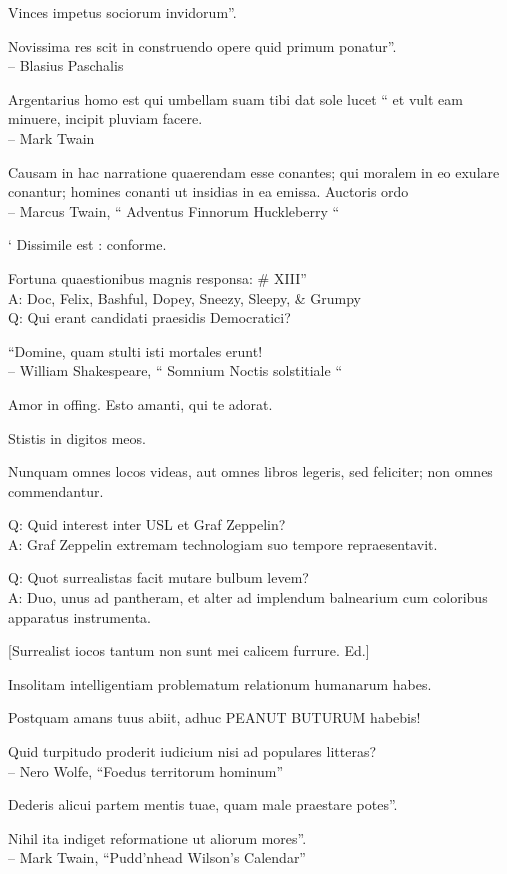 \documentclass[titlepage,12pt]{memoir}
\begin{document}
Vinces impetus sociorum invidorum”.

Novissima res scit in construendo opere quid primum ponatur”.
\\-- Blasius Paschalis

 Argentarius homo est qui umbellam suam tibi dat sole lucet “
et vult eam minuere, incipit pluviam facere.
\\-- Mark Twain

 Causam in hac narratione quaerendam esse conantes;
qui moralem in eo exulare conantur; homines conanti
ut insidias in ea emissa. Auctoris ordo
\\-- Marcus Twain, “ Adventus Finnorum Huckleberry “

‘ Dissimile est : conforme.

Fortuna quaestionibus magnis responsa: \# XIII”\\
A: Doc, Felix, Bashful, Dopey, Sneezy, Sleepy, \& Grumpy
\\Q: Qui erant candidati praesidis Democratici?

“Domine, quam stulti isti mortales erunt!
\\-- William Shakespeare, “ Somnium Noctis solstitiale “

Amor in offing. Esto amanti, qui te adorat.

Stistis in digitos meos.

Nunquam omnes locos videas, aut omnes libros legeris, sed feliciter;
non omnes commendantur.

Q: Quid interest inter USL et Graf Zeppelin?\\
A: Graf Zeppelin extremam technologiam suo tempore repraesentavit.

Q: Quot surrealistas facit mutare bulbum levem?\\
A: Duo, unus ad pantheram, et alter ad implendum balnearium
cum coloribus apparatus instrumenta.

[Surrealist iocos tantum non sunt mei calicem furrure. Ed.]

 Insolitam intelligentiam problematum relationum humanarum habes.

Postquam amans tuus abiit, adhuc PEANUT BUTURUM habebis!

Quid turpitudo proderit iudicium nisi ad populares litteras?
\\-- Nero Wolfe, “Foedus territorum hominum”

Dederis alicui partem mentis tuae, quam male praestare potes”.

Nihil ita indiget reformatione ut aliorum mores”.
\\-- Mark Twain, “Pudd’nhead Wilson’s Calendar”
\end{document}
